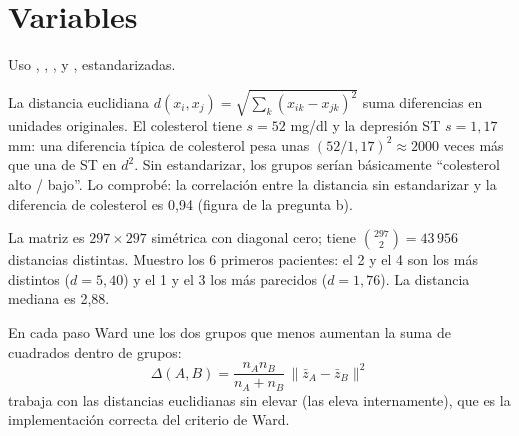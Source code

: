 \section*{Variables}
Uso , , ,  y
, estandarizadas.

La distancia euclidiana $d(x_i,x_j)=\sqrt{\sum_k (x_{ik}-x_{jk})^2}$ suma diferencias en unidades
originales. El colesterol tiene $s=52$ mg/dl y la depresión ST $s=1,17$ mm: una diferencia típica de
colesterol pesa unas $(52/1,17)^2\approx 2000$ veces más que una de ST en $d^2$. Sin estandarizar, los grupos
serían básicamente ``colesterol alto / bajo''. Lo comprobé: la correlación entre la distancia sin estandarizar
y la diferencia de colesterol es 0,94 (figura de la pregunta b).


La matriz es $297\times297$ simétrica con diagonal cero; tiene $\binom{297}{2}=43\,956$ distancias distintas.
Muestro los 6 primeros pacientes: el 2 y el 4 son los más distintos ($d=5,40$) y el 1 y el 3 los más
parecidos ($d=1,76$). La distancia mediana es 2,88.

En cada paso Ward une los dos grupos que menos aumentan la suma de cuadrados dentro de grupos:
\[
\Delta(A,B)=\frac{n_An_B}{n_A+n_B}\,\lVert\bar z_A-\bar z_B\rVert^2
\]
 trabaja con las distancias euclidianas sin elevar (las eleva internamente), que es la
implementación correcta del criterio de Ward.

